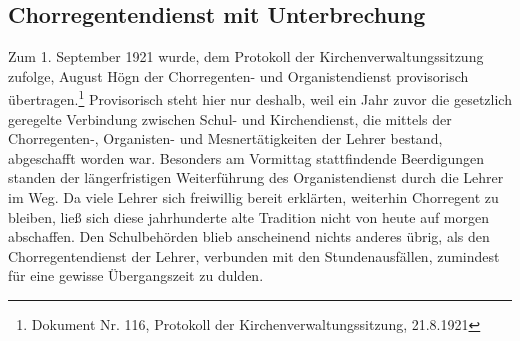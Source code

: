 \subsection{Chorregentendienst mit Unterbrechung}

\hypertarget{RefHeadingToc100333732}{}Zum 1. September 1921 wurde, dem
Protokoll der Kirchenverwaltungssitzung zufolge, August Högn der
Chorregenten- und Organistendienst provisorisch übertragen.\footnote{
Dokument Nr. 116, Protokoll der Kirchenverwaltungssitzung, 21.8.1921}
Provisorisch steht hier nur deshalb, weil ein Jahr zuvor die gesetzlich
geregelte Verbindung zwischen Schul- und Kirchendienst, die mittels der
Chorregenten-, Organisten- und Mesnertätigkeiten der Lehrer bestand,
abgeschafft worden war. Besonders am Vormittag stattfindende
Beerdigungen standen der längerfristigen Weiterführung des
Organistendienst durch die Lehrer im Weg. Da viele Lehrer sich
freiwillig bereit erklärten, weiterhin Chorregent zu bleiben, ließ sich
diese jahrhunderte alte Tradition nicht von heute auf morgen
abschaffen. Den Schulbehörden blieb anscheinend nichts anderes übrig,
als den Chorregentendienst der Lehrer, verbunden mit den
Stundenausfällen, zumindest für eine gewisse Übergangszeit zu dulden.

